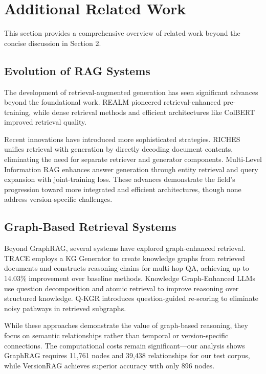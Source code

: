 \section{Additional Related Work}


This section provides a comprehensive overview of related work beyond the concise discussion in Section 2.

\subsection{Evolution of RAG Systems}

The development of retrieval-augmented generation has seen significant advances beyond the foundational work. REALM \cite{guu2020retrieval} pioneered retrieval-enhanced pre-training, while dense retrieval methods \cite{karpukhin2020dense} and efficient architectures like ColBERT \cite{khattab2020colbert} improved retrieval quality. 

Recent innovations have introduced more sophisticated strategies. RICHES \cite{jain2024ragriches} unifies retrieval with generation by directly decoding document contents, eliminating the need for separate retriever and generator components. Multi-Level Information RAG \cite{adjali2024multilevel} enhances answer generation through entity retrieval and query expansion with joint-training loss. These advances demonstrate the field's progression toward more integrated and efficient architectures, though none address version-specific challenges.

\subsection{Graph-Based Retrieval Systems}

Beyond GraphRAG, several systems have explored graph-enhanced retrieval. TRACE \cite{fang2024trace} employs a KG Generator to create knowledge graphs from retrieved documents and constructs reasoning chains for multi-hop QA, achieving up to 14.03\% improvement over baseline methods. Knowledge Graph-Enhanced LLMs \cite{li2024kgframework} use question decomposition and atomic retrieval to improve reasoning over structured knowledge. Q-KGR \cite{zhang2024qkgr} introduces question-guided re-scoring to eliminate noisy pathways in retrieved subgraphs.

While these approaches demonstrate the value of graph-based reasoning, they focus on semantic relationships rather than temporal or version-specific connections. The computational costs remain significant—our analysis shows GraphRAG requires 11,761 nodes and 39,438 relationships for our test corpus, while VersionRAG achieves superior accuracy with only 896 nodes.

